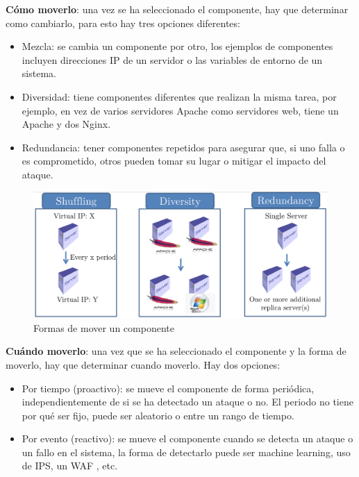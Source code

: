 \textbf{Cómo moverlo}: una vez se ha seleccionado el componente, hay que determinar como cambiarlo, para esto hay tres opciones diferentes:
\begin{itemize}
    \item Mezcla: se cambia un componente por otro, los ejemplos de componentes incluyen direcciones IP de un servidor o las variables de entorno de un sistema.
    \item Diversidad: tiene componentes diferentes que realizan la misma tarea, por ejemplo, en vez de varios servidores Apache como servidores web, tiene un Apache y dos Nginx.
    \item Redundancia: tener componentes repetidos para asegurar que, si uno falla o es comprometido, otros pueden tomar su lugar o mitigar el impacto del ataque. 
\end{itemize}

\begin{figure}[h]
    \centering
    \includegraphics[width=\linewidth]{./imagenes/tiposmovimientos.png}
    \caption{Formas de mover un componente}
\end{figure}

\textbf{Cuándo moverlo}: una vez que se ha seleccionado el componente y la forma de moverlo, hay que determinar cuando moverlo. Hay dos opciones:
\begin{itemize}
    \item Por tiempo (proactivo): se mueve el componente de forma periódica, independientemente de si se ha detectado un ataque o no. El periodo no tiene por qué ser fijo, puede ser aleatorio o entre un rango de tiempo.
    \item Por evento (reactivo): se mueve el componente cuando se detecta un ataque o un fallo en el sistema, la forma de detectarlo puede ser machine learning\cite{MTD-ML}, uso de IPS\cite{Design-Generic-Intrusion-Tolerant-Architecture}, un WAF \cite{MTD-WAF}, etc.
\end{itemize}

